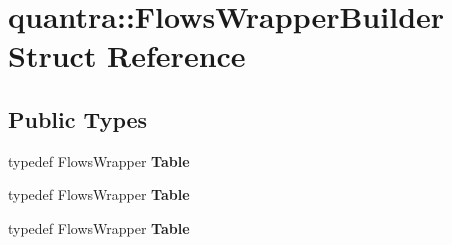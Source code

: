 \hypertarget{structquantra_1_1FlowsWrapperBuilder}{}\section{quantra\+:\+:Flows\+Wrapper\+Builder Struct Reference}
\label{structquantra_1_1FlowsWrapperBuilder}
\subsection*{Public Types}
\begin{DoxyCompactItemize}
\item 
\mbox{\label{structquantra_1_1FlowsWrapperBuilder_a5c1aff390bd89b772176d4ac77576060}} 
typedef Flows\+Wrapper {\bfseries Table}
\item 
\mbox{\label{structquantra_1_1FlowsWrapperBuilder_a5c1aff390bd89b772176d4ac77576060}} 
typedef Flows\+Wrapper {\bfseries Table}
\item 
\mbox{\label{structquantra_1_1FlowsWrapperBuilder_a5c1aff390bd89b772176d4ac77576060}} 
typedef Flows\+Wrapper {\bfseries Table}
\end{DoxyCompactItemize}
